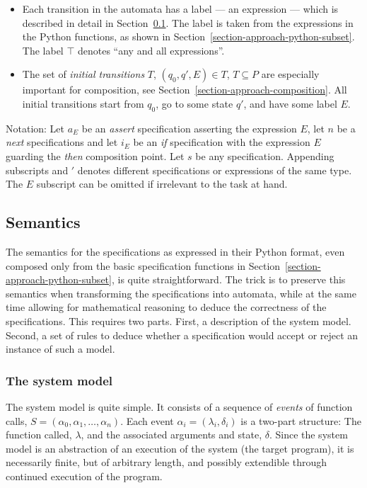 \documentclass[a4paper,11pt]{kth-mag}
\begin{document}
\begin{itemize}
  \item Each transition in the automata has a label --- an expression --- which
    is described in detail in Section~\ref{section-approach-semantics}. The
    label is taken from the expressions in the Python functions, as shown in
    Section~\ref{section-approach-python-subset}. The label $\top$ denotes ``any
    and all expressions''.

  \item The set of \textit{initial transitions} $T$, $(q_0, q', E) \in T$, $T
    \subseteq P$ are especially important for composition, see
    Section~\ref{section-approach-composition}. All initial transitions start
    from $q_0$, go to some state $q'$, and have some label $E$.
\end{itemize}

Notation: Let $a_E$ be an \textit{assert} specification asserting the
expression $E$, let $n$ be a \textit{next} specifications and let $i_E$ be an
\textit{if} specification with the expression $E$ guarding the \textit{then}
composition point. Let $s$ be any specification. Appending subscripts and $'$
denotes different specifications or expressions of the same type. The $E$
subscript can be omitted if irrelevant to the task at hand.


\subsection{Semantics} \label{section-approach-semantics}

The semantics for the specifications as expressed in their Python format, even
composed only from the basic specification functions in
Section~\ref{section-approach-python-subset}, is quite straightforward. The
trick is to preserve this semantics when transforming the specifications into
automata, while at the same time allowing for mathematical reasoning to deduce
the correctness of the specifications. This requires two parts. First, a
description of the system model. Second, a set of rules to deduce whether a
specification would accept or reject an instance of such a model.


\subsubsection{The system model}

The system model is quite simple. It consists of a sequence of \textit{events}
of function calls, $S = (\alpha_0, \alpha_1, \dots, \alpha_n)$. Each event
$\alpha_i = (\lambda_i, \delta_i)$ is a two-part structure: The function
called, $\lambda$, and the associated arguments and state, $\delta$. Since the
system model is an abstraction of an execution of the system (the target
program), it is necessarily finite, but of arbitrary length, and possibly
extendible through continued execution of the program.
\end{document}
